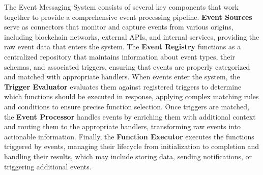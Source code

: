 \documentclass[12pt,a4paper]{article}
\begin{document}
The Event Messaging System consists of several key components that work together to provide a comprehensive event processing pipeline. \textbf{Event Sources} serve as connectors that monitor and capture events from various origins, including blockchain networks, external APIs, and internal services, providing the raw event data that enters the system. The \textbf{Event Registry} functions as a centralized repository that maintains information about event types, their schemas, and associated triggers, ensuring that events are properly categorized and matched with appropriate handlers. When events enter the system, the \textbf{Trigger Evaluator} evaluates them against registered triggers to determine which functions should be executed in response, applying complex matching rules and conditions to ensure precise function selection. Once triggers are matched, the \textbf{Event Processor} handles events by enriching them with additional context and routing them to the appropriate handlers, transforming raw events into actionable information. Finally, the \textbf{Function Executor} executes the functions triggered by events, managing their lifecycle from initialization to completion and handling their results, which may include storing data, sending notifications, or triggering additional events.
\end{document}
